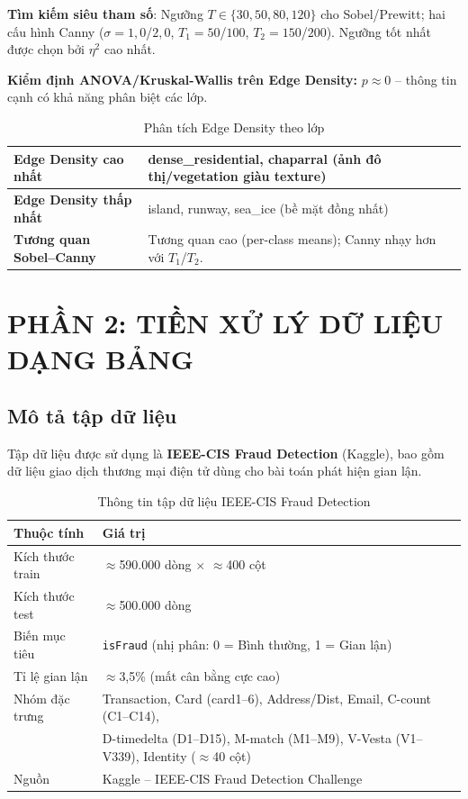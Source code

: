 \documentclass[12pt,a4paper]{article}
\let\oldtextbf\textbf
\renewcommand{\textbf}[1]{\oldtextbf{\textcolor{hcmublue}{#1}}}
\begin{document}
\textbf{Tìm kiếm siêu tham số}: Ngưỡng $T \in \{30, 50, 80, 120\}$ cho Sobel/Prewitt; hai cấu hình Canny ($\sigma = 1{,}0$/$2{,}0$, $T_1 = 50$/$100$, $T_2 = 150$/$200$). Ngưỡng tốt nhất được chọn bởi $\eta^2$ cao nhất.

\textbf{Kiểm định ANOVA/Kruskal-Wallis trên Edge Density:} $p \approx 0$ -- thông tin cạnh có khả năng phân biệt các lớp.

\begin{table}[H]
\centering
\begin{tabular}{|l|l|}
\hline
\textbf{Edge Density cao nhất}  & dense\_residential, chaparral (ảnh đô thị/vegetation giàu texture) \\ \hline
\textbf{Edge Density thấp nhất} & island, runway, sea\_ice (bề mặt đồng nhất) \\ \hline
\textbf{Tương quan Sobel--Canny} & Tương quan cao (per-class means); Canny nhạy hơn với $T_1$/$T_2$. \\ \hline
\end{tabular}
\caption{Phân tích Edge Density theo lớp}
\label{tab:edge_density}
\end{table}

\section{PHẦN 2: TIỀN XỬ LÝ DỮ LIỆU DẠNG BẢNG}

\subsection{Mô tả tập dữ liệu}

Tập dữ liệu được sử dụng là \textbf{IEEE-CIS Fraud Detection} (Kaggle), bao gồm dữ liệu giao dịch thương mại điện tử dùng cho bài toán phát hiện gian lận.

\begin{table}[H]
\centering
\begin{tabular}{|l|l|}
\hline
\textbf{Thuộc tính} & \textbf{Giá trị} \\ \hline
Kích thước train & $\approx$590.000 dòng $\times$ $\approx$400 cột \\ \hline
Kích thước test  & $\approx$500.000 dòng \\ \hline
Biến mục tiêu    & \texttt{isFraud} (nhị phân: 0 = Bình thường, 1 = Gian lận) \\ \hline
Tỉ lệ gian lận   & $\approx$3,5\% (mất cân bằng cực cao) \\ \hline
Nhóm đặc trưng   & Transaction, Card (card1--6), Address/Dist, Email, C-count (C1--C14), \\ 
                 & D-timedelta (D1--D15), M-match (M1--M9), V-Vesta (V1--V339), Identity ($\approx$40 cột) \\ \hline
Nguồn            & Kaggle -- IEEE-CIS Fraud Detection Challenge \\ \hline
\end{tabular}
\caption{Thông tin tập dữ liệu IEEE-CIS Fraud Detection}
\label{tab:tabular_dataset}
\end{table}
\end{document}
